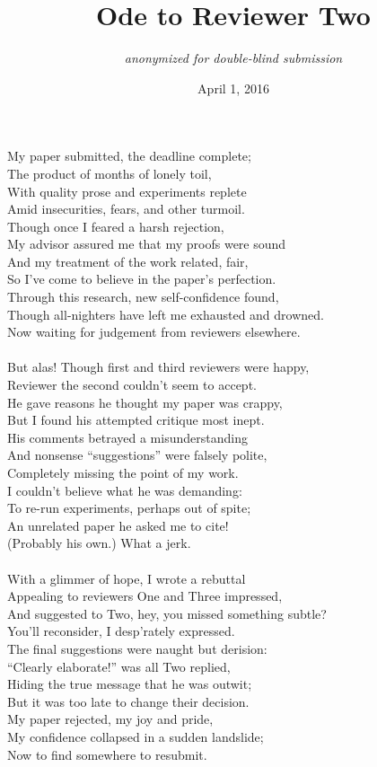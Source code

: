 \documentclass{article}
\title{Ode to Reviewer Two}
\author{{\em anonymized for double-blind submission}}
\date{April 1, 2016}
\begin{document}
\maketitle
\thispagestyle{empty}

\noindent
My paper submitted, the deadline complete;\\
The product of months of lonely toil,\\
With quality prose and experiments replete\\
Amid insecurities, fears, and other turmoil.\\
Though once I feared a harsh rejection,\\
My advisor assured me that my proofs were sound\\
And my treatment of the work related, fair,\\
So I've come to believe in the paper's perfection.\\
Through this research, new self-confidence found,\\
Though all-nighters have left me exhausted and drowned.\\
Now waiting for judgement from reviewers elsewhere.\\
\\
But alas! Though first and third reviewers were happy,\\
Reviewer the second couldn't seem to accept.\\
He gave reasons he thought my paper was crappy,\\
But I found his attempted critique most inept.\\
His comments betrayed a misunderstanding\\
And nonsense ``suggestions'' were falsely polite,\\
Completely missing the point of my work.\\
I couldn't believe what he was demanding:\\
To re-run experiments, perhaps out of spite;\\
An unrelated paper he asked me to cite!\\
(Probably his own.) What a jerk.\\
\\
With a glimmer of hope, I wrote a rebuttal\\
Appealing to reviewers One and Three impressed,\\
And suggested to Two, hey, you missed something subtle?\\
You'll reconsider, I desp'rately expressed.\\
The final suggestions were naught but derision:\\
``Clearly elaborate!'' was all Two replied,\\
Hiding the true message that he was outwit;\\
But it was too late to change their decision.\\
My paper rejected, my joy and pride,\\
My confidence collapsed in a sudden landslide;\\
Now to find somewhere to resubmit.\\
\end{document}
